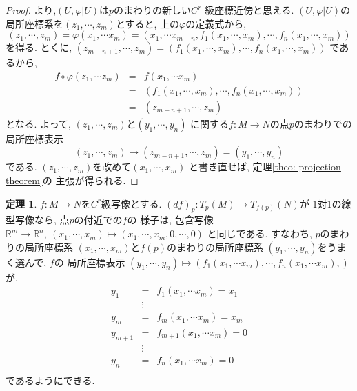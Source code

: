 \documentclass[a4j,12pt]{jarticle}
\theoremstyle{definition}
\newtheorem{theorem}{定理}[section]
\begin{document}
\begin{proof}
より,$(U, \varphi|U)$は$p$のまわりの新しい$C^r$
級座標近傍と思える. $(U, \varphi|U)$の
局所座標系を$(z_1,\cdots ,z_m)$とすると, 
上の$\varphi$の定義式から, 
$$(z_1,\cdots ,z_m)=\varphi(x_1,\cdots x_m)
=(x_1,\cdots x_{m-n},f_1(x_1,\cdots ,x_m), 
\cdots ,f_n(x_1,\cdots ,x_m))$$
を得る. とくに, $(z_{m-n+1},\cdots ,z_m)
=(f_1(x_1,\cdots ,x_m), 
\cdots ,f_n(x_1,\cdots ,x_m))$
であるから, 
\begin{eqnarray*}
    f\circ \varphi (z_1,\cdots z_m)&=&f(x_1,\cdots x_m)\\
    &=&(f_1(x_1,\cdots ,x_m),\cdots ,f_n(x_1,\cdots ,x_m))\\
    &=&(z_{m-n+1},\cdots ,z_m)
\end{eqnarray*}
となる. よって, $(z_1,\cdots ,z_m)$と$(y_1,\cdots ,y_n)$
に関する$f:M\to N$の点$p$のまわりでの局所座標表示
$$(z_1,\cdots ,z_m)\mapsto (z_{m-n+1},\cdots ,z_m)
=(y_1,\cdots ,y_n)$$
である. $(z_1,\cdots ,z_m)$を改めて$(x_1,\cdots ,x_m)$
と書き直せば, 定理\ref{theo: projection theorem}の
主張が得られる. 
\end{proof}
\begin{theorem}\label{theo:inclusion map theorem}
    $f:M\to N$を$C^r$級写像とする. 
    $(df)_p:T_p(M)\to T_{f(p)}(N)$が
    $1$対$1$の線型写像なら, 点$p$の付近での$f$の
    様子は, 包含写像
    $\mathbb{R}^m\to \mathbb{R}^n,\ 
    (x_1,\cdots ,x_m)\mapsto 
    (x_1,\cdots ,x_m,0,\cdots ,0)$
    と同じである. すなわち, $p$のまわりの局所座標系
    $(x_1,\cdots ,x_m)$と$f(p)$のまわりの局所座標系
    $(y_1,\cdots ,y_n)$をうまく選んで, $f$の
    局所座標表示
    $(y_1,\cdots ,y_n)\mapsto (f_1(x_1,\cdots x_m),
    \cdots ,f_n(x_1,\cdots x_m),)$が, 
    \begin{eqnarray*}
        y_1&=&f_1(x_1,\cdots x_m)=x_1\\
        &\vdots& \\
        y_m&=&f_m(x_1,\cdots x_m)=x_m\\
        y_{m+1}&=&f_{m+1}(x_1,\cdots x_m)=0\\
        &\vdots& \\
        y_n&=&f_n(x_1,\cdots x_m)=0\\
    \end{eqnarray*}
    であるようにできる. 
\end{theorem}
\end{document}
